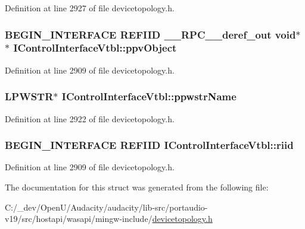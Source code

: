 Definition at line 2927 of file devicetopology.\+h.

\subsubsection[{\texorpdfstring{ppv\+Object}{ppvObject}}]{\setlength{\rightskip}{0pt plus 5cm}B\+E\+G\+I\+N\+\_\+\+I\+N\+T\+E\+R\+F\+A\+CE {\bf R\+E\+F\+I\+ID} {\bf \+\_\+\+\_\+\+R\+P\+C\+\_\+\+\_\+deref\+\_\+out} {\bf void}$\ast$$\ast$ I\+Control\+Interface\+Vtbl\+::ppv\+Object}\hypertarget{struct_i_control_interface_vtbl_a1588e670f399a8435ffd46a7d0f87321}{}\label{struct_i_control_interface_vtbl_a1588e670f399a8435ffd46a7d0f87321}


Definition at line 2909 of file devicetopology.\+h.

\subsubsection[{\texorpdfstring{ppwstr\+Name}{ppwstrName}}]{ {\bf L\+P\+W\+S\+TR}$\ast$ I\+Control\+Interface\+Vtbl\+::ppwstr\+Name}\hypertarget{struct_i_control_interface_vtbl_a6a086ffe853a07a8230b8c04fc3d20b3}{}\label{struct_i_control_interface_vtbl_a6a086ffe853a07a8230b8c04fc3d20b3}


Definition at line 2922 of file devicetopology.\+h.

\subsubsection[{\texorpdfstring{riid}{riid}}]{\setlength{\rightskip}{0pt plus 5cm}B\+E\+G\+I\+N\+\_\+\+I\+N\+T\+E\+R\+F\+A\+CE {\bf R\+E\+F\+I\+ID} I\+Control\+Interface\+Vtbl\+::riid}\hypertarget{struct_i_control_interface_vtbl_a97ecd5c54625b69abad2e89ce3ae2837}{}\label{struct_i_control_interface_vtbl_a97ecd5c54625b69abad2e89ce3ae2837}


Definition at line 2909 of file devicetopology.\+h.



The documentation for this struct was generated from the following file\+:\begin{DoxyCompactItemize}
\item 
C\+:/\+\_\+dev/\+Open\+U/\+Audacity/audacity/lib-\/src/portaudio-\/v19/src/hostapi/wasapi/mingw-\/include/\hyperlink{devicetopology_8h}{devicetopology.\+h}\end{DoxyCompactItemize}

